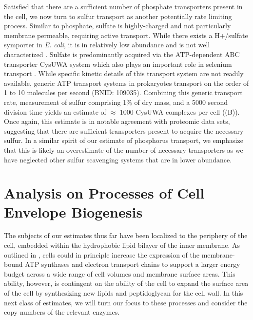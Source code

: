 Satisfied that there are a sufficient number of phosphate transporters
present in the cell, we now turn to sulfur transport as another potentially rate
limiting process. Similar to phosphate, sulfate is  highly-charged
and not particularly membrane permeable, requiring active
transport. While there exists a H+/sulfate symporter in \textit{E.
coli}, it is in relatively low abundance and is not well characterized
\citep{zhang2014}. Sulfate is predominantly acquired via the ATP-dependent ABC
transporter CysUWA system which also plays an important role in selenium
transport \citep{sekowska2000, sirko1995}. While specific kinetic details of
this transport system are not readily available, generic ATP transport
systems in prokaryotes transport on the order of 1 to 10 molecules per second
(BNID: 109035). Combining this generic
transport rate, measurement of sulfur comprising 1\% of dry mass, and a 5000
second division time yields an estimate of $\approx$ 1000 CysUWA
complexes per cell ((B)). Once again, this estimate
is in notable agreement with proteomic data sets, suggesting that there are
sufficient transporters present to acquire the necessary sulfur. In a similar
spirit of our estimate of phosphorus transport, we emphasize that this is
likely an overestimate of the number of necessary transporters as we have
neglected other sulfur scavenging systems that are in lower abundance.


\section{Analysis on Processes of Cell Envelope Biogenesis}
\label{sec:SI_envelope}
The subjects of our estimates thus far have been localized to the periphery of
the cell, embedded within the hydrophobic lipid bilayer of the inner membrane.
As outlined in , cells could in principle increase the
expression of the membrane-bound ATP synthases and electron transport chains to
support a larger energy budget across a wide range of cell volumes and membrane
surface areas. This ability, however, is contingent on the ability of the cell
to expand the surface area of the cell by synthesizing new lipids and
peptidoglycan for the cell wall. In this next class of estimates, we will
turn our focus to these processes and consider the copy numbers of the relevant
enzymes.

